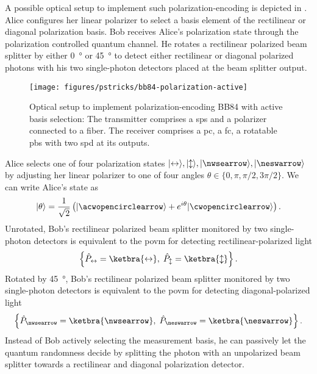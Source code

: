 A possible optical setup to implement such polarization-encoding is depicted in .
Alice configures her linear polarizer to select a basis element of the rectilinear or diagonal polarization basis. Bob receives Alice's polarization state through the polarization controlled quantum channel. He rotates a rectilinear polarized beam splitter by either \SI{0}{\degree} or \SI{45}{\degree} to detect either rectilinear or diagonal polarized photons with his two single-photon detectors placed at the beam splitter output.
\begin{figure}[htb]
	\centering
	\texttt{[image: figures/pstricks/bb84-polarization-active]}
	\caption{Optical setup to implement polarization-encoding BB84 with active basis selection: The transmitter comprises a \gls{sps} and a polarizer connected to a fiber. The receiver comprises a \gls{pc}, a \gls{fc}, a rotatable \gls{pbs} with two \gls{spd} at its outputs.}\label{fig:polarization_encoding_active}
\end{figure}
Alice selects one of four polarization states $\ket{\leftrightarrow},\ket{\updownarrow},\ket{\nwsearrow},\ket{\neswarrow}$ by adjusting her linear polarizer to one of four angles $\theta\in\{0,\pi,\pi/2,3\pi/2\}$.
We can write Alice's state as
\begin{equation}
	\ket{\theta}
	=
	\frac{1}{\sqrt{2}}
	\left(
		\ket{\acwopencirclearrow}
		+
		e^{i\theta}
		\ket{\cwopencirclearrow}
	\right)
	.
\end{equation}
Unrotated, Bob's rectilinear polarized beam splitter monitored by two single-photon detectors is equivalent to the \gls{povm} for detecting rectilinear-polarized light
\begin{equation}
	\left\{
		\hat{P}_{\leftrightarrow}
		=
		\ketbra{\leftrightarrow},
		\;
		\hat{P}_{\updownarrow}
		=
		\ketbra{\updownarrow}
	\right\}
	.
\end{equation}
Rotated by \SI{45}{\degree}, Bob's rectilinear polarized beam splitter monitored by two single-photon detectors is equivalent to the \gls{povm} for detecting diagonal-polarized light
\begin{equation}
	\left\{
		\hat{P}_{\nwsearrow}
		=
		\ketbra{\nwsearrow},
		\;
		\hat{P}_{\neswarrow}
		=
		\ketbra{\neswarrow}
	\right\}
	.
\end{equation}
Instead of Bob actively selecting the measurement basis, he can passively let the quantum randomness decide by splitting the photon with an unpolarized beam splitter towards a rectilinear and diagonal polarization detector.
